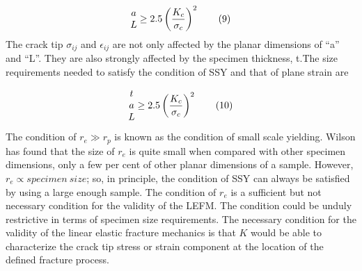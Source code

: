 \documentclass[11pt]{article}
\begin{document}
\begin{align*}
    \begin{array}{@{}c@{}} a\\L \end{array} \geq 2.5 \left( \frac{K_c}{\sigma_c}\right) ^2 \tag{9} \label{9}
\end{align*}
The crack tip $\sigma_{ij}$ and $\epsilon_{ij}$ are not only affected by the planar dimensions of “a” and “L”. They are also
strongly affected by the specimen thickness, t.The size requirements needed to
satisfy the condition of SSY and that of plane strain are
 
\begin{align*}
    \begin{array}{@{}c@{}} t\\a\\L \end{array} \geq 2.5 \left( \frac{K_c}{\sigma_c}\right) ^2 \tag{10} \label{10}
\end{align*}
The condition of $r_e \gg r_p$ is known as the condition of small scale yielding. Wilson has found that
the size of $r_e$ is quite small when compared with other specimen dimensions, only a few per cent of other
planar dimensions of a sample. However, $r_e \propto specimen\ size$; so, in principle, the
condition of SSY can always be satisfied by using a large enough sample. The condition of $r_e$ is a
sufficient but not necessary condition for the validity of the LEFM. The condition could be unduly
restrictive in terms of specimen size requirements. The necessary condition for the validity of the linear
elastic fracture mechanics is that $K$ would be able to characterize the crack tip stress or strain
component at the location of the defined fracture process.
\end{document}
